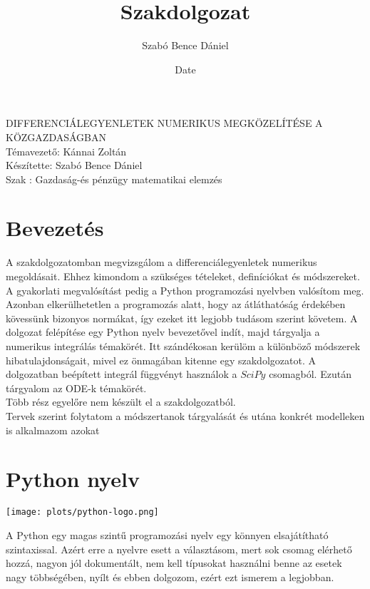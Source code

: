 \documentclass{article}
\title{Szakdolgozat}
\author{Szabó Bence Dániel }
\date{Date}
\theoremstyle{definition}
\theoremstyle{theorem}
\begin{document}
\begin{center}
\fontsize{40pt}{12pt}\selectfont
    
    DIFFERENCIÁLEGYENLETEK NUMERIKUS MEGKÖZELÍTÉSE A KÖZGAZDASÁGBAN\\
    \bigskip
    Témavezető: Kánnai Zoltán\\
    \bigskip
    Készítette: Szabó Bence Dániel\\
    \bigskip
    Szak : Gazdaság-és pénzügy matematikai elemzés
\end{center}

\pagebreak
\tableofcontents
\section{Bevezetés}
A szakdolgozatomban megvizsgálom a differenciálegyenletek numerikus megoldásait. Ehhez kimondom a szükséges tételeket, definíciókat és módszereket. A gyakorlati megvalósítást pedig a Python programozási nyelvben valósítom meg. Azonban elkerülhetetlen a programozás alatt, hogy az átláthatóság érdekében kövessünk bizonyos normákat, így ezeket itt legjobb tudásom szerint követem. A dolgozat felépítése egy Python nyelv bevezetővel indít, majd tárgyalja a numerikus integrálás témakörét. Itt szándékosan kerülöm a különböző módszerek hibatulajdonságait, mivel ez önmagában kitenne egy szakdolgozatot. A dolgozatban beépített integrál függvényt használok a $\textit{SciPy}$ csomagból. Ezután tárgyalom az ODE-k témakörét.\\

Több rész egyelőre nem készült el a szakdolgozatból.\\ Tervek szerint folytatom a módszertanok tárgyalását és utána konkrét modelleken is alkalmazom azokat

\section{Python nyelv}
\begin{center}
    \texttt{[image: plots/python-logo.png]}
\end{center}

A Python egy magas szintű programozási nyelv egy könnyen elsajátítható szintaxissal. Azért erre a nyelvre esett
a választásom, mert sok csomag elérhető hozzá, nagyon jól dokumentált, nem kell típusokat használni benne az 
esetek nagy többségében, nyílt és ebben dolgozom, ezért ezt ismerem a legjobban. 
\end{document}
